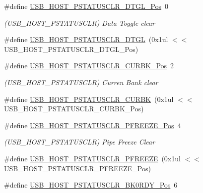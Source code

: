 \begin{DoxyCompactItemize}
\#define \mbox{\hyperlink{group___s_a_m_d21___u_s_b_gaa135a18eaf6212f305d744bae2fec39e}{U\+S\+B\+\_\+\+H\+O\+S\+T\+\_\+\+P\+S\+T\+A\+T\+U\+S\+C\+L\+R\+\_\+\+D\+T\+G\+L\+\_\+\+Pos}}~0
\begin{DoxyCompactList}\small\item\em (U\+S\+B\+\_\+\+H\+O\+S\+T\+\_\+\+P\+S\+T\+A\+T\+U\+S\+C\+LR) Data Toggle clear \end{DoxyCompactList}\item 
\#define \mbox{\hyperlink{group___s_a_m_d21___u_s_b_gaa05a0deb0a875d19edadfecb45f0ac1f}{U\+S\+B\+\_\+\+H\+O\+S\+T\+\_\+\+P\+S\+T\+A\+T\+U\+S\+C\+L\+R\+\_\+\+D\+T\+GL}}~(0x1ul $<$$<$ U\+S\+B\+\_\+\+H\+O\+S\+T\+\_\+\+P\+S\+T\+A\+T\+U\+S\+C\+L\+R\+\_\+\+D\+T\+G\+L\+\_\+\+Pos)
\item 
\#define \mbox{\hyperlink{group___s_a_m_d21___u_s_b_ga08ea45defeeadacf8ebf26fe2f1eab88}{U\+S\+B\+\_\+\+H\+O\+S\+T\+\_\+\+P\+S\+T\+A\+T\+U\+S\+C\+L\+R\+\_\+\+C\+U\+R\+B\+K\+\_\+\+Pos}}~2
\begin{DoxyCompactList}\small\item\em (U\+S\+B\+\_\+\+H\+O\+S\+T\+\_\+\+P\+S\+T\+A\+T\+U\+S\+C\+LR) Curren Bank clear \end{DoxyCompactList}\item 
\#define \mbox{\hyperlink{group___s_a_m_d21___u_s_b_ga2a86800eeaa20d8a161db5c2e7ddb73e}{U\+S\+B\+\_\+\+H\+O\+S\+T\+\_\+\+P\+S\+T\+A\+T\+U\+S\+C\+L\+R\+\_\+\+C\+U\+R\+BK}}~(0x1ul $<$$<$ U\+S\+B\+\_\+\+H\+O\+S\+T\+\_\+\+P\+S\+T\+A\+T\+U\+S\+C\+L\+R\+\_\+\+C\+U\+R\+B\+K\+\_\+\+Pos)
\item 
\#define \mbox{\hyperlink{group___s_a_m_d21___u_s_b_ga6ef007165e7b1ca7d2f12e64065fb86f}{U\+S\+B\+\_\+\+H\+O\+S\+T\+\_\+\+P\+S\+T\+A\+T\+U\+S\+C\+L\+R\+\_\+\+P\+F\+R\+E\+E\+Z\+E\+\_\+\+Pos}}~4
\begin{DoxyCompactList}\small\item\em (U\+S\+B\+\_\+\+H\+O\+S\+T\+\_\+\+P\+S\+T\+A\+T\+U\+S\+C\+LR) Pipe Freeze Clear \end{DoxyCompactList}\item 
\#define \mbox{\hyperlink{group___s_a_m_d21___u_s_b_gaba682d6c59f325f8d4eba5ec0164e3f2}{U\+S\+B\+\_\+\+H\+O\+S\+T\+\_\+\+P\+S\+T\+A\+T\+U\+S\+C\+L\+R\+\_\+\+P\+F\+R\+E\+E\+ZE}}~(0x1ul $<$$<$ U\+S\+B\+\_\+\+H\+O\+S\+T\+\_\+\+P\+S\+T\+A\+T\+U\+S\+C\+L\+R\+\_\+\+P\+F\+R\+E\+E\+Z\+E\+\_\+\+Pos)
\item 
\#define \mbox{\hyperlink{group___s_a_m_d21___u_s_b_gaf62a7896e46401a67d8c6f50566d847d}{U\+S\+B\+\_\+\+H\+O\+S\+T\+\_\+\+P\+S\+T\+A\+T\+U\+S\+C\+L\+R\+\_\+\+B\+K0\+R\+D\+Y\+\_\+\+Pos}}~6
$$
\end{DoxyCompactItemize}
